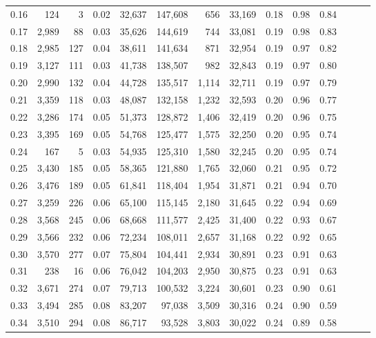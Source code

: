 \begin{tabular}{rrrrrrrrrrrrrr}
0.16 &    124 &      3 &  0.02 &   32,637 &  147,608 &     656 &  33,169 &  0.18 &  0.98 &      0.84 \\
0.17 &  2,989 &     88 &  0.03 &   35,626 &  144,619 &     744 &  33,081 &  0.19 &  0.98 &      0.83 \\
0.18 &  2,985 &    127 &  0.04 &   38,611 &  141,634 &     871 &  32,954 &  0.19 &  0.97 &      0.82 \\
0.19 &  3,127 &    111 &  0.03 &   41,738 &  138,507 &     982 &  32,843 &  0.19 &  0.97 &      0.80 \\
0.20 &  2,990 &    132 &  0.04 &   44,728 &  135,517 &   1,114 &  32,711 &  0.19 &  0.97 &      0.79 \\
0.21 &  3,359 &    118 &  0.03 &   48,087 &  132,158 &   1,232 &  32,593 &  0.20 &  0.96 &      0.77 \\
0.22 &  3,286 &    174 &  0.05 &   51,373 &  128,872 &   1,406 &  32,419 &  0.20 &  0.96 &      0.75 \\
0.23 &  3,395 &    169 &  0.05 &   54,768 &  125,477 &   1,575 &  32,250 &  0.20 &  0.95 &      0.74 \\
0.24 &    167 &      5 &  0.03 &   54,935 &  125,310 &   1,580 &  32,245 &  0.20 &  0.95 &      0.74 \\
0.25 &  3,430 &    185 &  0.05 &   58,365 &  121,880 &   1,765 &  32,060 &  0.21 &  0.95 &      0.72 \\
0.26 &  3,476 &    189 &  0.05 &   61,841 &  118,404 &   1,954 &  31,871 &  0.21 &  0.94 &      0.70 \\
0.27 &  3,259 &    226 &  0.06 &   65,100 &  115,145 &   2,180 &  31,645 &  0.22 &  0.94 &      0.69 \\
0.28 &  3,568 &    245 &  0.06 &   68,668 &  111,577 &   2,425 &  31,400 &  0.22 &  0.93 &      0.67 \\
0.29 &  3,566 &    232 &  0.06 &   72,234 &  108,011 &   2,657 &  31,168 &  0.22 &  0.92 &      0.65 \\
0.30 &  3,570 &    277 &  0.07 &   75,804 &  104,441 &   2,934 &  30,891 &  0.23 &  0.91 &      0.63 \\
0.31 &    238 &     16 &  0.06 &   76,042 &  104,203 &   2,950 &  30,875 &  0.23 &  0.91 &      0.63 \\
0.32 &  3,671 &    274 &  0.07 &   79,713 &  100,532 &   3,224 &  30,601 &  0.23 &  0.90 &      0.61 \\
0.33 &  3,494 &    285 &  0.08 &   83,207 &   97,038 &   3,509 &  30,316 &  0.24 &  0.90 &      0.59 \\
0.34 &  3,510 &    294 &  0.08 &   86,717 &   93,528 &   3,803 &  30,022 &  0.24 &  0.89 &      0.58 \\

\end{tabular}
